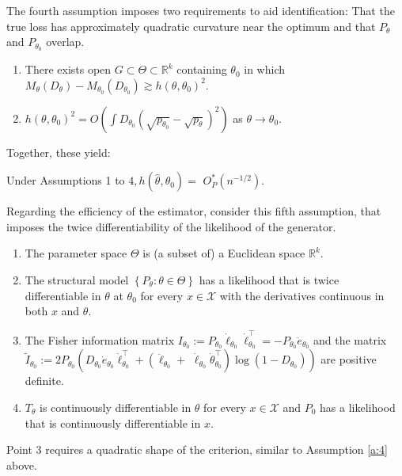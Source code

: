 The fourth assumption imposes two requirements to aid identification:
That the true loss has approximately quadratic curvature near the optimum and that $P_{\theta}$ and $P_{\theta_0}$ overlap.

\begin{assumption}[A4, KMP]
    \label{a:4}
    \begin{enumerate}
        \item There exists open $G \subset \Theta \subset \mathbb{R}^{k}$ containing $\theta_{0}$ in which $M_{\theta}\left(D_{\theta}\right)-M_{\theta_{0}}\left(D_{\theta_{0}}\right) \gtrsim h\left(\theta, \theta_{0}\right)^{2}$. 
        \item $h\left(\theta, \theta_{0}\right)^{2}=O\left(\int D_{\theta_{0}}\left(\sqrt{p_{\theta_{0}}}-\sqrt{p_{\theta}}\right)^{2}\right)$ as $\theta \rightarrow \theta_{0}$.
    \end{enumerate}
\end{assumption}

Together, these yield:
\begin{theorem}
\label{th:kmp_2}
    Under Assumptions 1 to $4, h\left(\hat{\theta}, \theta_{0}\right)=$ $O_{P}^{*}\left(n^{-1 / 2}\right)$.
\end{theorem}

Regarding the efficiency of the estimator, consider this fifth assumption, that imposes the twice differentiability of the likelihood of the generator. %
\begin{assumption}[A5, KMP]
\label{a:5}
    \begin{enumerate}
        \item The parameter space $\Theta$ is (a subset of) a Euclidean space $\mathbb{R}^{k}$. 
        \item The structural model $\left\{P_{\theta}: \theta \in \Theta\right\}$ has a likelihood that is twice differentiable in $\theta$ at $\theta_{0}$ for every $x \in \mathcal{X}$ with the derivatives continuous in both $x$ and $\theta$. 
        \item The Fisher information matrix $I_{\theta_{0}}:=P_{\theta_{0}} \dot{\ell}_{\theta_{0}} \dot{\ell}_{\theta_{0}}^{\top}=-P_{\theta_{0}} \ddot{e}_{\theta_{0}}$ and the matrix $\tilde{I}_{\theta_{0}}:=2 P_{\theta_{0}}\left(D_{\theta_{0}} \dot{e}_{\theta_{0}} \dot{\ell}_{\theta_{0}}^{\top}+\left(\ddot{\ell}_{\theta_{0}}+\right.\right.$ $\left.\left.\dot{\ell}_{\theta_{0}} \dot{\theta}_{\theta_{0}}^{\top}\right) \log \left(1-D_{\theta_{0}}\right)\right)$ are positive definite. 
        \item $T_{\theta}$ is continuously differentiable in $\theta$ for every $x \in \mathcal{X}$ and $P_{0}$ has a likelihood that is continuously differentiable in $x$.
    \end{enumerate}
\end{assumption}
Point 3 requires a quadratic shape of the criterion, similar to Assumption \ref{a:4} above. 

